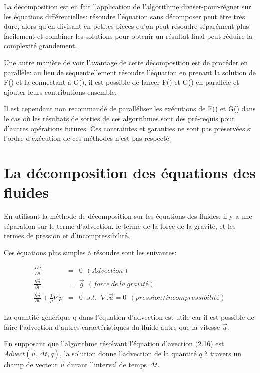 \documentclass[11pt]{report}
\begin{document}
La décomposition est en fait l'application de l'algorithme diviser-pour-régner sur les équations différentielles: résoudre l'équation sans décomposer peut être très dure, alors qu'en divisant en petites pièces qu'on peut résoudre séparément plus facilement et combiner les solutions pour obtenir un résultat final peut réduire la complexité grandement.\newline

Une autre manière de voir l'avantage de cette décomposition est de procéder en parallèle: au lieu de séquentiellement résoudre l'équation en prenant la solution de F() et la connectant à G(), il est possible de lancer F() et G() en parallèle et ajouter leurs contributions ensemble.\newline

Il est cependant non recommandé de paralléliser les exécutions de F() et G() dans le cas où les résultats de sorties de ces algorithmes sont des pré-requis pour d'autres opérations futures. Ces contraintes et garanties ne sont pas préservées si l'ordre d'exécution de ces méthodes n'est pas respecté. 

\section{La décomposition des équations des fluides}

En utilisant la méthode de décomposition sur les équations des fluides, il y a une séparation sur le terme d'advection, le terme de la force de la gravité, et les termes de pression et d'incompressibilité.

Ces équations plus simples à résoudre sont les suivantes:

\begin{eqnarray}
\frac{Dq}{Dt}  & = & 0 \:\: (Advection) \\
\frac{\partial \overrightarrow{u}}{\partial t} & = & \overrightarrow{g} \:\: (force\:de\: la\: gravité) \\
\frac{\partial \overrightarrow{u}}{\partial t} + \frac{1}{\rho} \nabla p & = & 0 \,\,\; s.t. \,\,\; \nabla . \overrightarrow{u} = 0 \:\: (pression/incompressibilité)
\end{eqnarray}

La quantité générique q dans l'équation d'advection est utile car il est possible de faire l'advection d'autres caractéristiques du fluide autre que la vitesse $ \overrightarrow{u} $. \newline

En supposant que l'algorithme résolvant  l'équation d'avection (2.16) est $ \mathit{Advect(\overrightarrow{u}, \Delta t, q)} $, la solution donne l'advection de la quantité $ q $ à travers un champ de vecteur $ \overrightarrow{u} $ durant l'interval de temps $ \Delta t $.\newline
\end{document}

